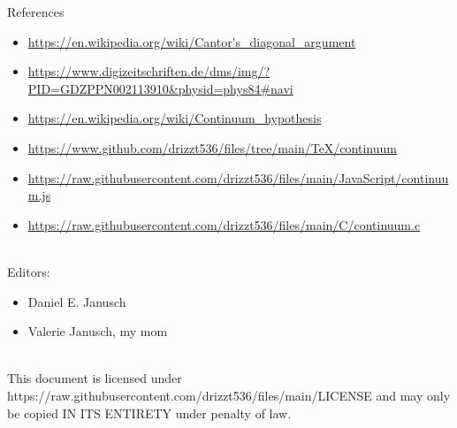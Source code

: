 \documentclass[12pt]{article}
\begin{document}
\pagebreak\begin{section}{References}\label{sec:references}

	\begin{itemize}
		\item\url{https://en.wikipedia.org/wiki/Cantor's\_diagonal\_argument}\\

		\item\url{https://www.digizeitschriften.de/dms/img/?PID=GDZPPN002113910&physid=phys84#navi}\\

		\item\url{https://en.wikipedia.org/wiki/Continuum\_hypothesis}\\

		\item\url{https://www.github.com/drizzt536/files/tree/main/TeX/continuum}\\

		\item\url{https://raw.githubusercontent.com/drizzt536/files/main/JavaScript/continuum.js}\\

		\item\url{https://raw.githubusercontent.com/drizzt536/files/main/C/continuum.c}\\
	\end{itemize}
	\vspace{1em}\\
	Editors:
	\begin{itemize}
		\item Daniel E. Janusch
		\item Valerie Janusch, my mom
	\end{itemize}
	\vspace{3em}\\
	This document is licensed under https://raw.githubusercontent.com/drizzt536/files/main/LICENSE
	and may only be copied IN ITS ENTIRETY under penalty of law.
\end{section}
\end{document}
